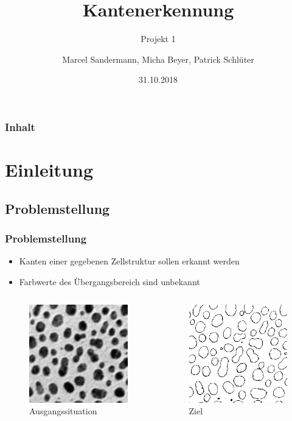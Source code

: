 \documentclass[14pt]{beamer}
\begin{document}
	\author[Gruppe D]{Marcel Sandermann, Micha Beyer, Patrick Schlüter}
	\title{Kantenerkennung}
	\subtitle{Projekt 1}
	\date{31.10.2018}
	
	
\begin{frame}
	\titlepage
\end{frame}
\begin{frame}
	\frametitle{Inhalt}
	\tableofcontents	
\end{frame}
\section{Einleitung}
\subsection{Problemstellung}
\begin{frame}
	\frametitle{Problemstellung}
	\begin{itemize}
		\item Kanten einer gegebenen Zellstruktur sollen erkannt werden
		\item Farbwerte des Übergangsbereich sind unbekannt		
	\end{itemize}
	\begin{columns}[c]
		\begin{figure}
		\includegraphics[width=0.5\linewidth]{Anfang.png}
		\caption{Ausgangssituation}	
		\end{figure}
		\begin{figure}
			\includegraphics[width=0.5\linewidth]{Ergebnis.png}
			\caption{Ziel}
		\end{figure}		 	
	\end{columns}	
\end{frame}
\end{document}
